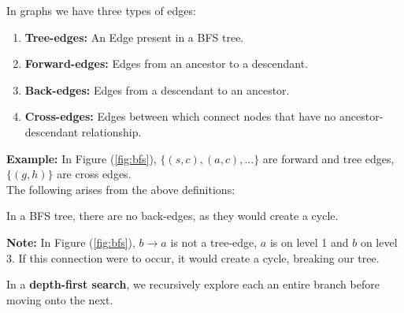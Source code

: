     \newpage

    \begin{Def}

        In graphs we have three types of edges:
        \begin{enumerate}
            \item \textbf{Tree-edges:} An Edge present in a BFS tree.
            \item \textbf{Forward-edges:} Edges from an ancestor to a descendant.
            \item \textbf{Back-edges:} Edges from a descendant to an ancestor.
            \item \textbf{Cross-edges:} Edges between which connect nodes that have no ancestor-descendant relationship.
        \end{enumerate}
    \end{Def}

    \noindent
    \textbf{Example:} In Figure (\ref{fig:bfs}), $\{(s,c),(a,c),...\}$ are forward and tree edges, $\{(g,h)\}$ are cross edges.\\

    \noindent
    The following arises from the above definitions:
    \begin{theo}
        
        In a BFS tree, there are no back-edges, as they would create a cycle.
    \end{theo}
    \begin{Note}
        \textbf{Note:} In Figure (\ref{fig:bfs}), $b\rightarrow a$ is not a tree-edge, $a$ is on level 1 and $b$ on level 3. If
        this connection were to occur, it would create a cycle, breaking our tree.
    \end{Note}
    \newpage
    \begin{Def}

        In a \textbf{depth-first search}, we recursively explore each an entire branch before moving onto the next.
    \end{Def}

